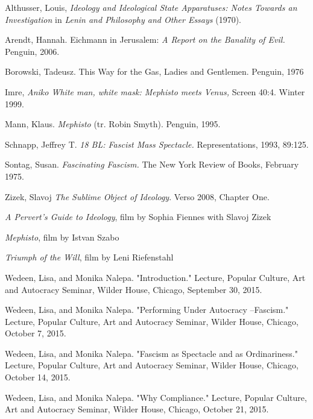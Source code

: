 \documentclass[a4paper, 11pt]{article} %
\begin{document}
 \begin{thebibliography}{1}

    Althusser, Louis, \textit{Ideology and Ideological State Apparatuses: Notes Towards an Investigation} in \textit{Lenin and Philosophy and Other Essays}  (1970).

   Arendt, Hannah. Eichmann in Jerusalem: \textit{A Report on the Banality of Evil.} Penguin, 2006. 
  
   Borowski, Tadeusz. This Way for the Gas, Ladies and Gentlemen. Penguin, 1976

  
   Imre, \textit{Aniko White man, white mask: Mephisto meets Venus,} Screen 40:4. Winter 1999. 
  
   Mann, Klaus. \textit{Mephisto} (tr. Robin Smyth). Penguin, 1995. 

   Schnapp, Jeffrey T. \textit{18 BL: Fascist Mass Spectacle.} Representations, 1993, 89:125. 

   Sontag, Susan. \textit{Fascinating Fascism.} The New York Review of Books, February 1975.   
  
   Zizek, Slavoj \textit{The Sublime Object of Ideology}. Verso 2008, Chapter One.
  
   \textit{A Pervert's Guide to Ideology}, film by Sophia Fiennes with Slavoj Zizek
  
   \textit{Mephisto}, film by Istvan Szabo 
    
   \textit{Triumph of the Will}, film by Leni Riefenstahl     
    
    
   Wedeen, Lisa, and Monika Nalepa. "Introduction." Lecture, Popular Culture, Art and Autocracy Seminar, Wilder House, Chicago, September 30, 2015.

   Wedeen, Lisa, and Monika Nalepa. "Performing Under Autocracy --Fascism." Lecture, Popular Culture, Art and Autocracy Seminar, Wilder House, Chicago, October 7, 2015.

   Wedeen, Lisa, and Monika Nalepa. "Fascism as Spectacle and as Ordinariness." Lecture, Popular Culture, Art and Autocracy Seminar, Wilder House, Chicago, October 14, 2015.

   Wedeen, Lisa, and Monika Nalepa. "Why Compliance." Lecture, Popular Culture, Art and Autocracy Seminar, Wilder House, Chicago, October 21, 2015.





  \end{thebibliography}
\end{document}

